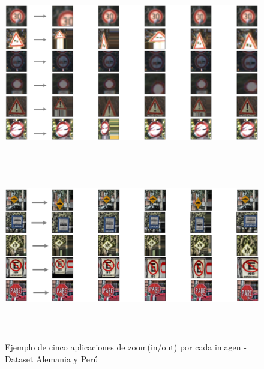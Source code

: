 
			\begin{figure}[H]
				\begin{center}
				\includegraphics[width=1\textwidth,height=7.5cm]{images/desarrollo/Augment/zoom_inv}
				\includegraphics[width=1\textwidth,height=7.5cm]{images/desarrollo/Augment/zoom_inv2}
				\end{center}
				\begin{center}
				\vspace{0.5em}
				\caption{\small{Ejemplo de cinco aplicaciones de zoom(in/out) por cada imagen - Dataset Alemania y Perú}}
				{\small{\fontsize{10}{16.8}\selectfont {Fuente: Elaboración propia}}}
				\end{center}
				\vspace{-1.5em}
			\end{figure}

